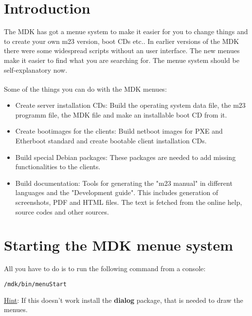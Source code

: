 \section{Introduction}
The MDK has got a menue system to make it easier for you to change things and to create your own m23 version, boot CDs etc.. In earlier versions of the MDK there were some widespread scripts without an user interface. The new menues make it easier to find what you are searching for. The menue system should be self-explanatory now.\\\\

Some of the things you can do with the MDK menues:
\begin{itemize}
\item Create server installation CDs: Build the operating system data file, the m23 programm file, the MDK file and make an installable boot CD from it.
\item Create bootimages for the clients: Build netboot images for PXE and Etherboot standard and create bootable client installation CDs.
\item Build special Debian packages: These packages are needed to add missing functionalities to the clients.
\item Build documentation: Tools for generating the "m23 manual" in different languages and the "Development guide". This includes generation of screenshots, PDF and HTML files. The text is fetched from the online help, source codes and other sources.
\end{itemize}

\section{Starting the MDK menue system}
All you have to do is to run the following command from a console:
\begin{verbatim}
/mdk/bin/menuStart
\end{verbatim}
\underline{Hint}: If this doesn't work install the \textbf{dialog} package, that is needed to draw the menues.